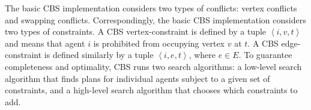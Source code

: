\documentclass[review]{elsarticle}
\newcommand{\tuple}[1]{\ensuremath{\left \langle #1 \right \rangle }}
\newcommand\roni[1]{\nb{\textbf{Roni:}}{green}{#1}}
\newcommand\dor[1]{\nb{\textbf{Dor:}}{Fuchsia}{#1}}
\newcommand{\cbs}{\ac{CBS}\xspace}
\begin{document}
The basic \cbs implementation considers two types of conflicts: vertex conflicts and swapping conflicts. 
Correspondingly, the basic \cbs implementation considers two types of constraints. 
A \cbs vertex-constraint is defined by a tuple $\tuple{i,v,t}$ and means that agent $i$ is prohibited from occupying vertex $v$ at $t$.  
A \cbs edge-constraint is defined similarly by a tuple $\tuple{i,e,t}$, where $e\in E$. To guarantee completeness and optimality, \cbs runs two search algorithms: a low-level search algorithm that finds plans for individual agents subject to a given set of constraints, and a high-level search algorithm that chooses which constraints to add. 





\end{document}
